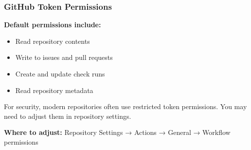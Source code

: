 \begin{frame}
	\frametitle{GitHub Token Permissions}
	\textbf{Default permissions include:}
	\begin{itemize}
		\item Read repository contents
		\item Write to issues and pull requests
		\item Create and update check runs
		\item Read repository metadata
	\end{itemize}
	\pause
	\begin{hint}
		{For security, modern repositories often use restricted token permissions. You may need to adjust them in repository settings.}
	\end{hint}
	\pause
	\textbf{Where to adjust:} Repository Settings → Actions → General → Workflow permissions
\end{frame}

% 

